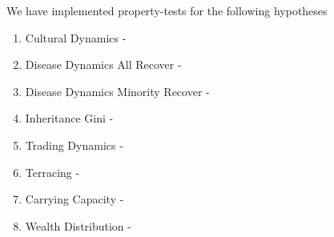
We have implemented property-tests for the following hypotheses

\begin{enumerate}
	\item Cultural Dynamics -
	\item Disease Dynamics All Recover -
	\item Disease Dynamics Minority Recover -
	\item Inheritance Gini -
	\item Trading Dynamics -
	\item Terracing -
	\item Carrying Capacity -
	\item Wealth Distribution -
\end{enumerate}
